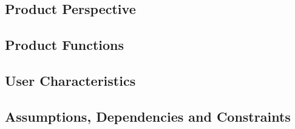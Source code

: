 \subsection{Product Perspective}
\label{sect:overview:prodpersp}


\subsection{Product Functions}
\label{sect:overview:prodfunctions}


\subsection{User Characteristics}
\label{sect:overview:userchars}


\subsection{Assumptions, Dependencies and Constraints}
\label{sect:overview:domassumptions}
